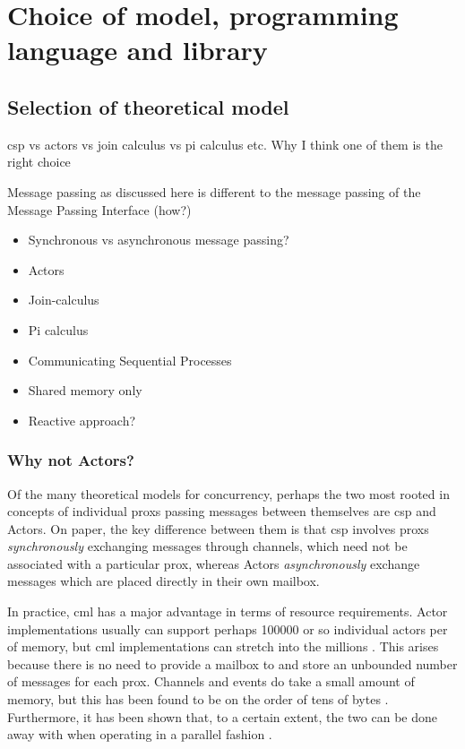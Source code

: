 \glsresetall

\chapter{Choice of model, programming language and library}

\section{Selection of theoretical model}
\gls{csp} vs actors vs join calculus vs pi calculus etc.  Why I think one of them is the right choice

Message passing as discussed here is different to the message passing of the Message Passing Interface (how?)

\begin{itemize}
    \item Synchronous vs asynchronous message passing?
    \item Actors
    \item Join-calculus
    \item Pi calculus
    \item Communicating Sequential Processes
    \item Shared memory only
    \item Reactive approach?
\end{itemize}

\subsection{Why not Actors?}
Of the many theoretical models for concurrency, perhaps the two most rooted in concepts of individual \glspl{prox} passing messages between themselves are \gls{csp} and Actors.  On paper, the key difference between them is that \gls{csp} involves \glspl{prox} \emph{synchronously} exchanging messages through channels, which need not be associated with a particular \gls{prox}, whereas Actors \emph{asynchronously} exchange messages which are placed directly in their own mailbox.


In practice, \gls{cml} has a major advantage in terms of resource requirements.  Actor implementations usually can support perhaps \num{100 000} or so individual actors per \si{\gibi\byte} of memory, but \gls{cml} implementations can stretch into the millions \cite{Butcher2014}.  This arises because there is no need to provide a mailbox to and store an unbounded number of messages for each \gls{prox}.  Channels and events do take a small amount of memory, but this has been found to be on the order of tens of bytes \cite{Reppy1991}.  Furthermore, it has been shown that, to a certain extent, the two can be done away with when operating in a parallel fashion \cite{Reppy2007a}.

